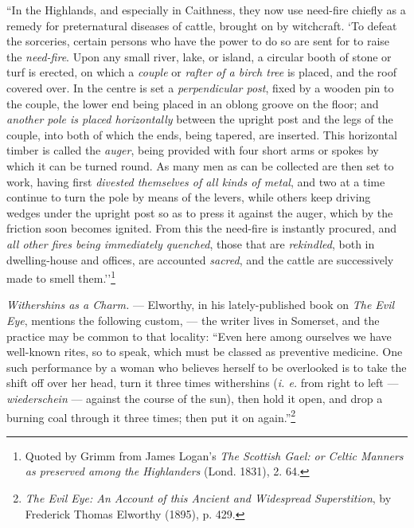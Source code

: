 \documentclass[a4paper, 11pt, oneside, polutonikogreek, english]{article}
\begin{document}
``In the Highlands, and especially in Caithness, they now use need-fire chiefly as a remedy for preternatural diseases of cattle, brought on by witchcraft. `To defeat the sorceries, certain persons who have the power to do so are sent for to raise the \emph{need-fire}. Upon any small river, lake, or island, a circular booth of stone or turf is erected, on which a \emph{couple} or \emph{rafter of a birch tree} is placed, and the roof covered over. In the centre is set a \emph{perpendicular post}, fixed by a wooden pin to the couple, the lower end being placed in an oblong groove on the floor; and \emph{another pole is placed horizontally} between the upright post and the legs of the couple, into both of which the ends, being tapered, are inserted. This horizontal timber is called the \emph{auger}, being provided with four short arms or spokes by which it can be turned round. As many men as can be collected are then set to work, having first \emph{divested themselves of all kinds of metal}, and two at a time continue to turn the pole by means of the levers, while others keep driving wedges under the upright post so as to press it against the auger, which by the friction soon becomes ignited. From this the need-fire is instantly procured, and \emph{all other fires being immediately quenched}, those that are \emph{rekindled}, both in dwelling-house and offices, are accounted \emph{sacred}, and the cattle are successively made to smell them.''\footnote{Quoted by Grimm from James Logan's \emph{The Scottish Gael: or Celtic Manners as preserved among the Highlanders} (Lond. 1831), 2. 64.}

\emph{Withershins as a Charm.} --- Elworthy, in his lately-published book on \emph{The Evil Eye}, mentions the following custom, --- the writer lives in Somerset, and the practice may be common to that locality: ``Even here among ourselves we have well-known rites, so to speak, which must be classed as preventive medicine. One such performance by a woman who believes herself to be overlooked is to take the shift off over her head, turn it three times withershins (\emph{i. e.} from right to left --- \emph{wiederschein} --- against the course of the sun), then hold it open, and drop a burning coal through it three times; then put it on again.''\footnote{\emph{The Evil Eye: An Account of this Ancient and Widespread Superstition}, by Frederick Thomas Elworthy (1895), p. 429.}
\end{document}
